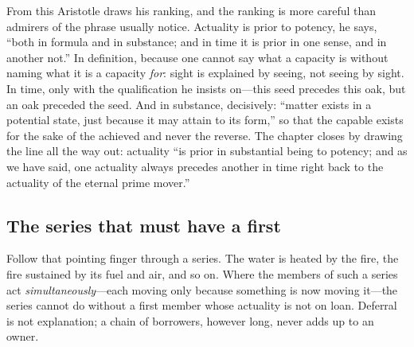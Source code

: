 From this Aristotle draws his ranking, and the ranking is more careful than admirers of the phrase usually notice. Actuality is prior to potency, he says, ``both in formula and in substance; and in time it is prior in one sense, and in another not.'' In definition, because one cannot say what a capacity is without naming what it is a capacity \emph{for}: sight is explained by seeing, not seeing by sight. In time, only with the qualification he insists on---this seed precedes this oak, but an oak preceded the seed. And in substance, decisively: ``matter exists in a potential state, just because it may attain to its form,'' so that the capable exists for the sake of the achieved and never the reverse. The chapter closes by drawing the line all the way out: actuality ``is prior in substantial being to potency; and as we have said, one actuality always precedes another in time right back to the actuality of the eternal prime mover.''

\subsection{The series that must have a first}

Follow that pointing finger through a series. The water is heated by the fire, the fire sustained by its fuel and air, and so on. Where the members of such a series act \emph{simultaneously}---each moving only because something is now moving it---the series cannot do without a first member whose actuality is not on loan. Deferral is not explanation; a chain of borrowers, however long, never adds up to an owner.


